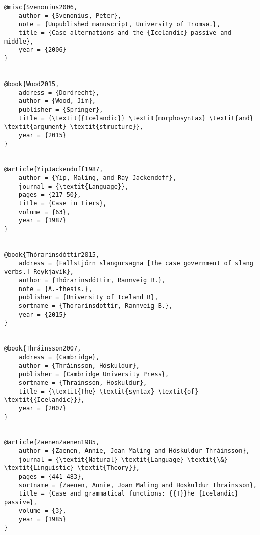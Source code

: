 \documentclass[output=paper,modfonts,nonflat]{langsci/langscibook}
\begin{document}
\begin{verbatim}
@misc{Svenonius2006,
	author = {Svenonius, Peter},
	note = {Unpublished manuscript, University of Tromsø.},
	title = {Case alternations and the {Icelandic} passive and middle},
	year = {2006}
}


@book{Wood2015,
	address = {Dordrecht},
	author = {Wood, Jim},
	publisher = {Springer},
	title = {\textit{{Icelandic}} \textit{morphosyntax} \textit{and} \textit{argument} \textit{structure}},
	year = {2015}
}


@article{YipJackendoff1987,
	author = {Yip, Maling, and Ray Jackendoff},
	journal = {\textit{Language}},
	pages = {217–50},
	title = {Case in Tiers},
	volume = {63},
	year = {1987}
}


@book{Thórarinsdóttir2015,
	address = {Fallstjórn slangursagna [The case government of slang verbs.] Reykjavík},
	author = {Thórarinsdóttir, Rannveig B.},
	note = {A.-thesis.},
	publisher = {University of Iceland B},
	sortname = {Thorarinsdottir, Rannveig B.},
	year = {2015}
}


@book{Thráinsson2007,
	address = {Cambridge},
	author = {Thráinsson, Höskuldur},
	publisher = {Cambridge University Press},
	sortname = {Thrainsson, Hoskuldur},
	title = {\textit{The} \textit{syntax} \textit{of} \textit{{Icelandic}}},
	year = {2007}
}


@article{ZaenenZaenen1985,
	author = {Zaenen, Annie, Joan Maling and Höskuldur Thráinsson},
	journal = {\textit{Natural} \textit{Language} \textit{\&} \textit{Linguistic} \textit{Theory}},
	pages = {441–483},
	sortname = {Zaenen, Annie, Joan Maling and Hoskuldur Thrainsson},
	title = {Case and grammatical functions: {{T}}he {Icelandic} passive},
	volume = {3},
	year = {1985}
}


\end{verbatim}
\sloppy\printbibliography[heading=subbibliography,notkeyword=this]
\end{document}
